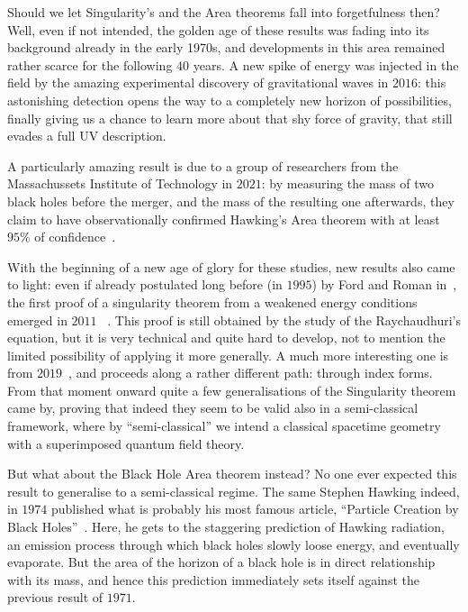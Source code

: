 Should we let Singularity's and the Area theorems fall into forgetfulness then? Well, even if not intended, the golden age of these results was fading into its background already in the early 1970s, and developments in this area remained rather scarce for the following \(40\) years. A new spike of energy was injected in the field by the amazing experimental discovery of gravitational waves in \(2016\): this astonishing detection opens the way to a completely new horizon of possibilities, finally giving us a chance to learn more about that shy force of gravity, that still evades a full UV description.

A particularly amazing result is due to a group of researchers from the Massachussets Institute of Technology in \(2021\): by measuring the mass of two black holes before the merger, and the mass of the resulting one afterwards, they claim to have observationally confirmed Hawking's Area theorem with at least \(95\%\) of confidence~\cite[]{PhysRevLett.127.011103}.

With the beginning of a new age of glory for these studies, new results also came to light: even if already postulated long before (in \(1995\)) by Ford and Roman in~\cite[]{ford1996averaged}, the first proof of a singularity theorem from a weakened energy conditions emerged in \(2011\)~\cite[]{fewster2011singularity} . This proof is still obtained by the study of the Raychaudhuri's equation, but it is very technical and quite hard to develop, not to mention the limited possibility of applying it more generally. A much more interesting one is from \(2019\)~\cite[]{fewster2020new}, and proceeds along a rather different path: through index forms.
From that moment onward quite a few generalisations of the Singularity theorem came by, proving that indeed they seem to be valid also in a semi-classical framework, where by ``semi-classical'' we intend a classical spacetime geometry with a superimposed quantum field theory.

But what about the Black Hole Area theorem instead? No one ever expected this result to generalise to a semi-classical regime. The same Stephen Hawking indeed, in \(1974\) published what is probably his most famous article, ``Particle Creation by Black Holes''~\cite[]{hawking1975particle}. Here, he gets to the staggering prediction of Hawking radiation, an emission process through which black holes slowly loose energy, and eventually evaporate. But the area of the horizon of a black hole is in direct relationship with its mass, and hence this prediction immediately sets itself against the previous result of \(1971\).


